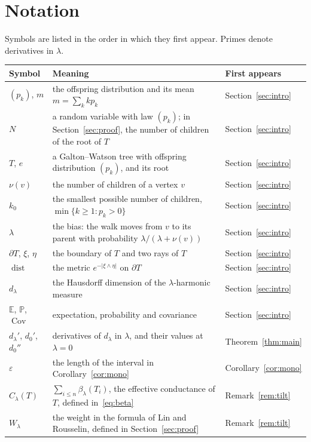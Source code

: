 \documentclass[11pt]{amsart}
\theoremstyle{definition}
\newcommand{\Prob}{\mathbb{P}}
\newcommand{\E}{\mathbb{E}}
\newcommand{\eps}{\varepsilon}
\newcommand{\Cov}{\operatorname{Cov}}
\begin{document}
\appendix
\section{Notation}\label{app:notation}
Symbols are listed in the order in which they first appear. Primes denote derivatives in $\lambda$.

{\small\begin{longtable}{@{}lp{}p{}@{}}\toprule
Symbol & Meaning & First appears\\ \midrule\endhead
$(p_k)$, $m$ & the offspring distribution and its mean $m=\sum_kkp_k$ & Section~\ref{sec:intro}\\
$N$ & a random variable with law $(p_k)$; in Section~\ref{sec:proof}, the number of children of the root of $T$ & Section~\ref{sec:intro}\\
$T$, $e$ & a Galton--Watson tree with offspring distribution $(p_k)$, and its root & Section~\ref{sec:intro}\\
$\nu(v)$ & the number of children of a vertex $v$ & Section~\ref{sec:intro}\\
$k_0$ & the smallest possible number of children, $\min\{k\ge1:p_k>0\}$ & Section~\ref{sec:intro}\\
$\lambda$ & the bias: the walk moves from $v$ to its parent with probability $\lambda/(\lambda+\nu(v))$ & Section~\ref{sec:intro}\\
$\partial T$, $\xi$, $\eta$ & the boundary of $T$ and two rays of $T$ & Section~\ref{sec:intro}\\
$\operatorname{dist}$ & the metric $e^{-|\xi\wedge\eta|}$ on $\partial T$ & Section~\ref{sec:intro}\\
$d_\lambda$ & the Hausdorff dimension of the $\lambda$-harmonic measure & Section~\ref{sec:intro}\\
$\E$, $\Prob$, $\Cov$ & expectation, probability and covariance & Section~\ref{sec:intro}\\
$d_\lambda'$, $d_0'$, $d_0''$ & derivatives of $d_\lambda$ in $\lambda$, and their values at $\lambda=0$ & Theorem~\ref{thm:main}\\
$\eps$ & the length of the interval in Corollary~\ref{cor:mono} & Corollary~\ref{cor:mono}\\
$C_\lambda(T)$ & $\sum_{i\le n}\beta_\lambda(T_i)$, the effective conductance of $T$, defined in~\eqref{eq:beta} & Remark~\ref{rem:tilt}\\
$W_\lambda$ & the weight in the formula of Lin and Rousselin, defined in Section~\ref{sec:proof} & Remark~\ref{rem:tilt}\\

\end{longtable}}
\end{document}
